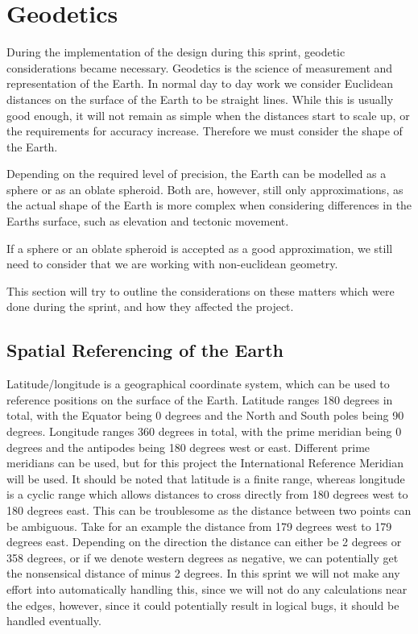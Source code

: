\section{Geodetics}

During the implementation of the design during this sprint, geodetic considerations became necessary. Geodetics is the science of measurement and representation of the Earth\cite{website:Wikipedia-geodesy}. In normal day to day work we consider Euclidean distances on the surface of the Earth to be straight lines. While this is usually good enough, it will not remain as simple when the distances start to scale up, or the requirements for accuracy increase. Therefore we must consider the shape of the Earth.

Depending on the required level of precision, the Earth can be modelled as a sphere or as an oblate spheroid\cite{}. Both are, however, still only approximations, as the actual shape of the Earth is more complex when considering differences in the Earths surface, such as elevation and tectonic movement.

If a sphere or an oblate spheroid is accepted as a good approximation, we still need to consider that we are working with non-euclidean geometry.

This section will try to outline the considerations on these matters which were done during the sprint, and how they affected the project.

\subsection{Spatial Referencing of the Earth}

Latitude/longitude is a geographical coordinate system, which can be used to reference positions on the surface of the Earth. Latitude ranges 180 degrees in total, with the Equator being 0 degrees and the North and South poles being 90 degrees\cite{}. Longitude ranges 360 degrees in total, with the prime meridian being 0 degrees and the antipodes being 180 degrees west or east\cite{}. Different prime meridians can be used, but for this project the International Reference Meridian will be used\cite{}. It should be noted that latitude is a finite range, whereas longitude is a cyclic range which allows distances to cross directly from 180 degrees west to 180 degrees east. This can be troublesome as the distance between two points can be ambiguous. Take for an example the distance from 179 degrees west to 179 degrees east. Depending on the direction the distance can either be 2 degrees or 358 degrees, or if we denote western degrees as negative, we can potentially get the nonsensical distance of minus 2 degrees. In this sprint we will not make any effort into automatically handling this, since we will not do any calculations near the edges, however, since it could potentially result in logical bugs, it should be handled eventually.

